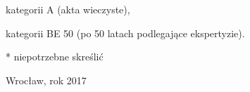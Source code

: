 \documentclass[12pt,a4paper,twoside]{book}
\begin{document}
\begin{titlepage}
\begin{flushleft}
\begin{compactenum}
\item kategorii A (akta wieczyste),
\item kategorii BE 50 (po 50 latach podlegające ekspertyzie).
\end{compactenum}
* niepotrzebne skreślić
\end{flushleft}
\vspace*{12pt}
\begin{flushright}
\end{flushright}
\vspace*{12pt}
\begin{center}
Wrocław, rok 2017
\end{center}
\end{titlepage}
\restoregeometry
\end{document}

